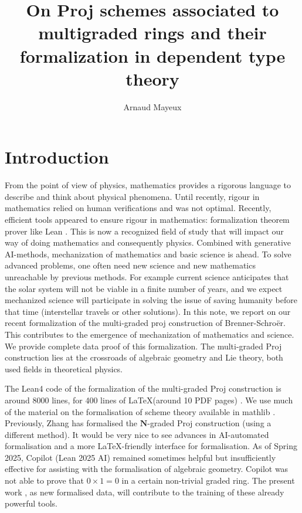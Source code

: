\documentclass[graybox]{svmult}
\begin{document}
\title*{On Proj schemes associated to multigraded rings and their formalization in dependent type theory}
\author{Arnaud Mayeux}

%
%
\maketitle


\section*{Introduction}
From the point of view of physics, mathematics provides a rigorous language to describe and think about physical phenomena. 
Until recently, rigour in mathematics relied on human verifications and was not optimal. Recently, efficient tools appeared to ensure rigour in mathematics: formalization theorem prover like Lean \cite{dMal15, dMU21, Av24, Bu24}. 
This is now a recognized field of study that will impact our way of doing mathematics and consequently physics. Combined with generative AI-methods, mechanization of mathematics and basic science is ahead. 
To solve advanced problems, one often need new science and new mathematics unreachable by previous methods. For example current science anticipates that the solar system will not be viable in a finite number of years, and we expect mechanized science will participate in solving the issue of saving humanity before that time (interstellar travels or other solutions). In this note, we report on our recent formalization of the multi-graded proj construction of Brenner-Schroër. This contributes to the emergence of mechanization of mathematics and science. We provide complete data proof of this formalization. The multi-graded Proj construction lies at the crossroads of algebraic geometry and Lie theory, both used fields in theoretical physics.

The Lean4 code of the formalization of the multi-graded Proj construction is around 8000 lines, for 400 lines of \LaTeX  (around 10 PDF pages) \cite{MZ25}.
We use much of the material on the formalisation of scheme theory available in mathlib \cite{Bual22, WZ22}.
Previously, Zhang has formalised the $\mathbf{N}$-graded $\mathrm{Proj}$ construction \cite{Z23} (using a different method).
It would be very nice to see advances in AI-automated formalisation and a more \LaTeX-friendly interface for formalisation.
As of Spring 2025, Copilot (Lean 2025 AI) remained sometimes helpful but insufficiently effective for assisting with the formalisation of algebraic geometry. Copilot was not able to prove that $0 \times 1 = 0$ in a certain non-trivial graded ring. The present work \cite{MZ25}, as new formalised data, will contribute to the training of these already powerful tools.
\end{document}
